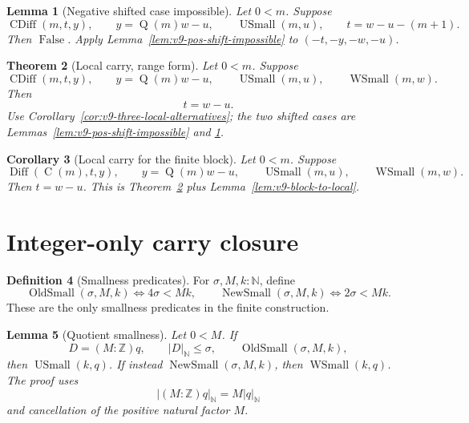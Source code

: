 \documentclass[11pt]{article}
\theoremstyle{definition}
\newtheorem{definition}{Definition}[section]
\theoremstyle{plain}
\newtheorem{theorem}[definition]{Theorem}
\newtheorem{lemma}[definition]{Lemma}
\newtheorem{corollary}[definition]{Corollary}
\theoremstyle{remark}
\newcommand{\N}{\mathbb{N}}
\newcommand{\Z}{\mathbb{Z}}
\newcommand{\nabs}[1]{\left|#1\right|_{\N}}
\newcommand{\Diff}{\operatorname{Diff}}
\newcommand{\Cblock}{\operatorname{C}}
\newcommand{\Qfun}{\operatorname{Q}}
\newcommand{\CDiff}{\operatorname{CDiff}}
\newcommand{\USmall}{\operatorname{USmall}}
\newcommand{\WSmall}{\operatorname{WSmall}}
\newcommand{\OldSmall}{\operatorname{OldSmall}}
\newcommand{\NewSmall}{\operatorname{NewSmall}}
\begin{document}
\begin{lemma}[Negative shifted case impossible]\label{lem:v9-neg-shift-impossible}
Let \(0<m\).  Suppose
\[
        \CDiff(m,t,y),
        \qquad y=\Qfun(m)w-u,
        \qquad \USmall(m,u),
        \qquad t=w-u-(m+1).
\]
Then \(\operatorname{False}\).
Apply Lemma~\ref{lem:v9-pos-shift-impossible} to \((-t,-y,-w,-u)\).
\end{lemma}

\begin{theorem}[Local carry, range form]\label{thm:v9-local-carry-range}
Let \(0<m\).  Suppose
\[
        \CDiff(m,t,y),
        \qquad y=\Qfun(m)w-u,
        \qquad \USmall(m,u),
        \qquad \WSmall(m,w).
\]
Then
\[
        t=w-u.
\]
Use Corollary~\ref{cor:v9-three-local-alternatives}; the two shifted cases are Lemmas~\ref{lem:v9-pos-shift-impossible} and \ref{lem:v9-neg-shift-impossible}.
\end{theorem}

\begin{corollary}[Local carry for the finite block]\label{cor:v9-local-carry-block}
Let \(0<m\).  Suppose
\[
        \Diff(\Cblock(m),t,y),
        \qquad y=\Qfun(m)w-u,
        \qquad \USmall(m,u),
        \qquad \WSmall(m,w).
\]
Then \(t=w-u\).  This is Theorem~\ref{thm:v9-local-carry-range} plus Lemma~\ref{lem:v9-block-to-local}.
\end{corollary}

\section{Integer-only carry closure}

\begin{definition}[Smallness predicates]\label{def:v9-smallness}
For \(\sigma,M,k:\N\), define
\[
        \OldSmall(\sigma,M,k)\Longleftrightarrow 4\sigma<Mk,
        \qquad
        \NewSmall(\sigma,M,k)\Longleftrightarrow 2\sigma<Mk.
\]
These are the only smallness predicates in the finite construction.
\end{definition}

\begin{lemma}[Quotient smallness]\label{lem:v9-quotient-smallness}
Let \(0<M\).  If
\[
        D=(M:\Z)q,
        \qquad
        \nabs D\le \sigma,
        \qquad
        \OldSmall(\sigma,M,k),
\]
then \(\USmall(k,q)\).  If instead \(\NewSmall(\sigma,M,k)\), then \(\WSmall(k,q)\).
The proof uses
\[
        \nabs{(M:\Z)q}=M\nabs q
\]
and cancellation of the positive natural factor \(M\).
\end{lemma}
\end{document}
